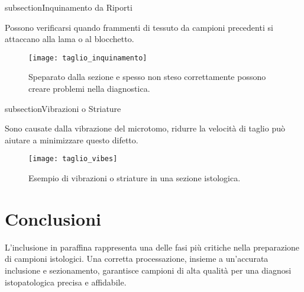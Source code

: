 subsection{Inquinamento da Riporti}

Possono verificarsi quando frammenti di tessuto da campioni precedenti si attaccano alla lama o al blocchetto.

\begin{figure}[h]
\centering  
\texttt{[image: taglio\_inquinamento]}
\caption{Speparato dalla sezione e spesso non steso correttamente possono creare problemi nella diagnostica.}
\end{figure}

subsection{Vibrazioni o Striature}

Sono causate dalla vibrazione del microtomo, ridurre la velocità di taglio può aiutare a minimizzare questo difetto.

\begin{figure}[h]
\centering  
\texttt{[image: taglio\_vibes]}
\caption{Esempio di vibrazioni o striature in una sezione istologica.}
\end{figure}


\section{Conclusioni}

L'inclusione in paraffina rappresenta una delle fasi più critiche nella preparazione di campioni istologici. Una corretta processazione, insieme a un'accurata inclusione e sezionamento, garantisce campioni di alta qualità per una diagnosi istopatologica precisa e affidabile.

